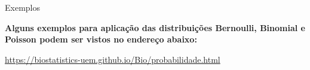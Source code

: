 \documentclass[9pt]{beamer}
\begin{document}
\begin{frame}{Exemplos}{}

\textbf{Alguns exemplos para aplicação das distribuições Bernoulli,
Binomial e Poisson podem ser vistos no endereço abaixo:\\}
\indent

\url{https://biostatistics-uem.github.io/Bio/probabilidade.html}

\end{frame}


{\pbebg
\begin{frame}


\end{frame}}
\end{document}
